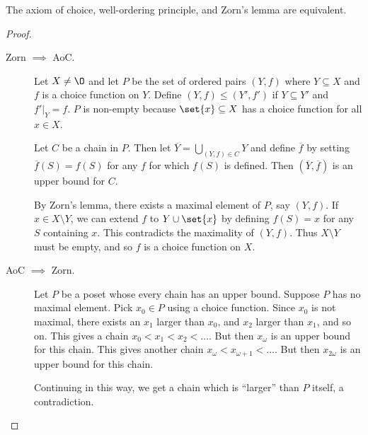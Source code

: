 \begin{fact}
    The axiom of choice, well-ordering principle, and Zorn's lemma are
    equivalent.
\end{fact}
\begin{proof}
    \begin{description}
        \item[Zorn $\implies$ AoC.]
            Let $X \ne \O$ and let $P$ be the set of ordered pairs $(Y, f)$
            where $Y \subseteq X$ and $f$ is a choice function on $Y$.
            Define $(Y, f) \le (Y', f')$ if $Y \subseteq Y'$ and
            $f' \vert_Y = f$.
            $P$ is non-empty because $\set{x} \subseteq X$ has a choice
            function for all $x \in X$.

            Let $C$ be a chain in $P$.
            Then let $\overline{Y} = \bigcup_{(Y, f) \in C} Y$ and define
            $\overline{f}$ by setting $\overline{f}(S) = f(S)$ for any $f$
            for which $f(S)$ is defined.
            Then $(\overline{Y}, \overline{f})$ is an upper bound for $C$.

            By Zorn's lemma, there exists a maximal element of $P$, say
            $(Y, f)$.
            If $x \in X \setminus Y$, we can extend $f$ to $Y \cup \set{x}$
            by defining $f(S) = x$ for any $S$ containing $x$.
            This contradicts the maximality of $(Y, f)$.
            Thus $X \setminus Y$ must be empty, and so $f$ is a choice
            function on $X$.
        \item[AoC $\implies$ Zorn.]
            Let $P$ be a poset whose every chain has an upper bound.
            Suppose $P$ has no maximal element.
            Pick $x_0 \in P$ using a choice function.
            Since $x_0$ is not maximal, there exists an $x_1$ larger than
            $x_0$, and $x_2$ larger than $x_1$, and so on.
            This gives a chain $x_0 < x_1 < x_2 < \dots$.
            But then $x_\omega$ is an upper bound for this chain.
            This gives another chain $x_\omega < x_{\omega + 1} < \dots$.
            But then $x_{2\omega}$ is an upper bound for this chain.

            Continuing in this way, we get a chain which is ``larger'' than
            $P$ itself, a contradiction.
    \end{description}
\end{proof}
